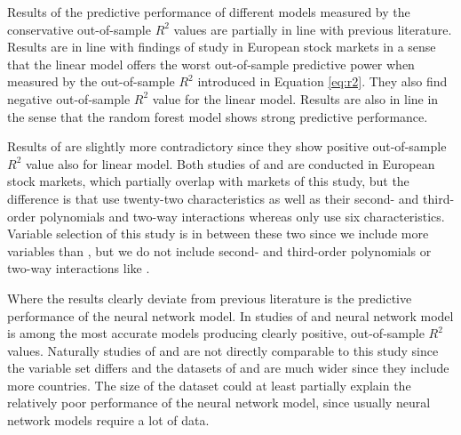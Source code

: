 \documentclass[12pt]{article}
\begin{document}
Results of the predictive performance of different models measured by the conservative out-of-sample $R^2$ values are partially in line with previous literature. Results are in line with findings of \citet{Drobetz} study in European stock markets in a sense that the linear model offers the worst out-of-sample predictive power when measured by the out-of-sample $R^2$ introduced in Equation \ref{eq:r2}. They also find negative out-of-sample $R^2$ value for the linear model. Results are also in line in the sense that the random forest model shows strong predictive performance.\footnotemark {} \par

Results of \citet{Fieberg} are slightly more contradictory since they show positive out-of-sample $R^2$ value also for linear model.\footnotemark {} Both studies of \citeauthor{Drobetz} and \citeauthor{Fieberg} are conducted in European stock markets, which partially overlap with markets of this study, but the difference is that \citeauthor{Drobetz} use twenty-two characteristics as well as their  second- and third-order polynomials and two-way interactions whereas \citeauthor{Fieberg} only use six characteristics. Variable selection of this study is in between these two since we include more variables than \citeauthor{Fieberg}, but we do not include second- and third-order polynomials or two-way interactions like \citeauthor{Drobetz}.\footnotemark {} \par

Where the results clearly deviate from previous literature is the predictive performance of the neural network model. In studies of \citet{Drobetz} and \citet{Fieberg} neural network model is among the most accurate models producing clearly positive, out-of-sample $R^2$ values.\footnotemark {} Naturally studies of \citeauthor{Drobetz} and \citeauthor{Fieberg} are not directly comparable to this study since the variable set differs and the datasets of  \citeauthor{Drobetz} and \citeauthor{Fieberg} are much wider since they include more countries. The size of the dataset could at least partially explain the relatively poor performance of the neural network model, since usually neural network models require a lot of data. \par
\end{document}
